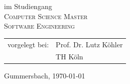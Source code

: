 \begin{titlepage}
\begin{center}
\vspace{0.4cm}

\begin{large}
im Studiengang\\ 
\vspace{0.2cm}
\textsc{Computer Science Master \\
Software Engineering}
\end{large}


\vspace{1.0cm}

\begin{tabular}{rl}
	vorgelegt bei:  &  Prof. Dr. Lutz Köhler\\
       					&  \small TH Köln \\[1.0em]
\end{tabular}

\vspace{1.6cm}

\begin{large}
Gummersbach, {\today}
\end{large}
\end{center}

\vspace{2.0cm}

\newpage
\thispagestyle{empty}

\end{titlepage}
